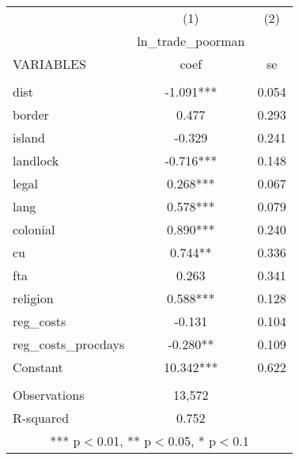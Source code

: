 \documentclass[]{article}
\begin{document}
\begin{tabular}{lcc} \hline
 & (1) & (2) \\
 & ln\_trade\_poorman &  \\
VARIABLES & coef & se \\ \hline
 &  &  \\
dist & -1.091*** & 0.054 \\
border & 0.477 & 0.293 \\
island & -0.329 & 0.241 \\
landlock & -0.716*** & 0.148 \\
legal & 0.268*** & 0.067 \\
lang & 0.578*** & 0.079 \\
colonial & 0.890*** & 0.240 \\
cu & 0.744** & 0.336 \\
fta & 0.263 & 0.341 \\
religion & 0.588*** & 0.128 \\
reg\_costs & -0.131 & 0.104 \\
reg\_costs\_procdays & -0.280** & 0.109 \\
Constant & 10.342*** & 0.622 \\
 &  &  \\
Observations & 13,572 &  \\
 R-squared & 0.752 &  \\ \hline
\multicolumn{3}{c}{ *** p$<$0.01, ** p$<$0.05, * p$<$0.1} \\
\end{tabular}
\end{document}
